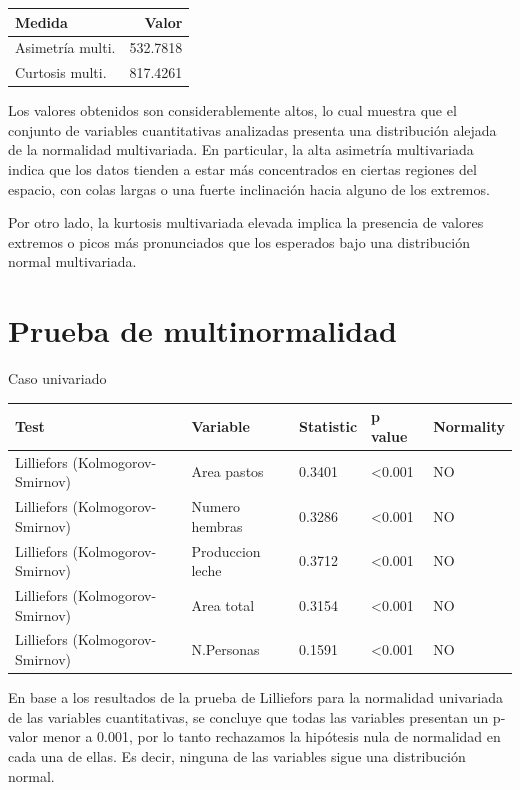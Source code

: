\documentclass[]{tufte-handout}
\begin{document}
\begin{justify}

\begin{marginfigure}
 
\begin{tabular}{lr}
\toprule
Medida & Valor\\
\midrule
Asimetría multi. & 532.7818\\
Curtosis multi. & 817.4261\\
\bottomrule
\end{tabular} 
\end{marginfigure}

Los valores obtenidos son considerablemente altos, lo cual muestra que el conjunto de variables cuantitativas analizadas presenta una distribución alejada de la normalidad multivariada. En particular, la alta asimetría multivariada indica que los datos tienden a estar más concentrados en ciertas regiones del espacio, con colas largas o una fuerte inclinación hacia alguno de los extremos.

Por otro lado, la kurtosis multivariada elevada implica la presencia de valores extremos o picos más pronunciados que los esperados bajo una distribución normal multivariada.

\end{justify}

\section{Prueba de multinormalidad}\label{prueba-de-multinormalidad}

Caso univariado \vspace{0.3 cm}

\begin{tabular}{lllll}
\toprule
Test & Variable & Statistic & p value & Normality\\
\midrule
Lilliefors (Kolmogorov-Smirnov) & Area pastos & 0.3401 & <0.001 & NO\\
Lilliefors (Kolmogorov-Smirnov) & Numero hembras & 0.3286 & <0.001 & NO\\
Lilliefors (Kolmogorov-Smirnov) & Produccion leche & 0.3712 & <0.001 & NO\\
Lilliefors (Kolmogorov-Smirnov) & Area total & 0.3154 & <0.001 & NO\\
Lilliefors (Kolmogorov-Smirnov) & N.Personas & 0.1591 & <0.001 & NO\\
\bottomrule
\end{tabular}
\vspace{0.2 cm}
\begin{justify}
En base a los resultados de la prueba de Lilliefors para la normalidad univariada de las variables cuantitativas, se concluye que todas las variables presentan un p-valor menor a 0.001, por lo tanto rechazamos la hipótesis nula de normalidad en cada una de ellas. Es decir, ninguna de las variables sigue una distribución normal.
\end{justify}
\end{document}
